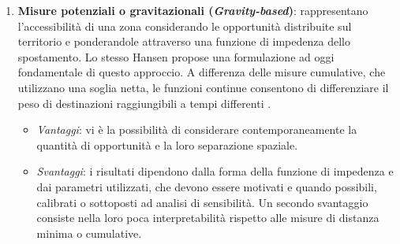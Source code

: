 \begin{enumerate}
          \item \textbf{Misure potenziali o gravitazionali (\textit{Gravity-based})}: rappresentano l'accessibilità di una zona considerando le opportunità distribuite sul territorio e ponderandole attraverso una funzione di impedenza dello spostamento. Lo stesso Hansen propose una formulazione ad oggi fondamentale di questo approccio.
        A differenza delle misure cumulative, che utilizzano una soglia netta, le funzioni continue consentono di differenziare il peso di destinazioni raggiungibili a tempi differenti \cite{hansen1959,geurs2004}.
         
        \begin{itemize}
            \item \textit{Vantaggi}: vi è la possibilità di considerare contemporaneamente la quantità di opportunità e la loro separazione spaziale.         
            \item \textit{Svantaggi}: i risultati dipendono dalla forma della funzione di impedenza e dai parametri utilizzati, che devono essere motivati e quando possibili, calibrati o sottoposti ad analisi di sensibilità. Un secondo svantaggio consiste nella loro poca interpretabilità rispetto alle misure di distanza minima o cumulative.
         \end{itemize}
        

\end{enumerate}
